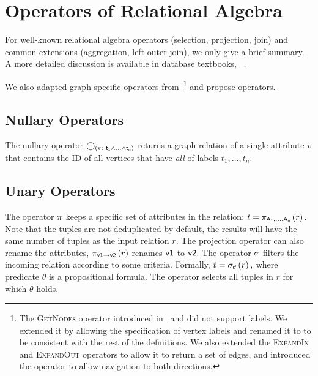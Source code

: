 \section{Operators of Relational Algebra}

For well-known relational algebra operators (\eg selection, projection, join) and common extensions (\eg aggregation, left outer join), we only give a brief summary. A more detailed discussion is available in database textbooks, \eg~\cite{DBLP:books/daglib/0020812, DBLP:books/daglib/0006733}.

We also adapted graph-specific operators from~\cite{DBLP:conf/edbt/HolschG16}\footnote{The \textsc{GetNodes} operator introduced in~\cite{DBLP:conf/edbt/HolschG16} and did not support labels. We extended it by allowing the specification of vertex labels and renamed it to \getverticestext to be consistent with the rest of the definitions. We also extended the \textsc{ExpandIn} and \textsc{ExpandOut} operators to allow it to return a set of edges, and introduced the \expandbothtext operator to allow navigation to both directions.} and propose operators.

\subsection{Nullary Operators}
\label{sec:nullary-operators}

The \getverticestext nullary operator $\getvertices{v}{t_1 \land \ldots \land t_n}$ returns a graph relation of a single attribute $v$ that contains the ID of all vertices that have \emph{all} of labels $t_1, \ldots, t_n$.

\subsection{Unary Operators}
\label{sec:unary-operators}

The \projectiontext operator $\pi$ keeps a specific set of attributes in the relation: $ t = \pi_{\mathsf{A_1, \ldots, A_n}} \left(r\right).$ Note that the tuples are not deduplicated by default, \ie the results will have the same number of tuples as the input relation $r$. The projection operator can also rename the attributes, \eg $\pi_{\mathsf{v1 \rightarrow v2}} \left(r\right)$ renames $\mathsf{v1}$ to $\mathsf{v2}$.
The \selectiontext operator $\sigma$ filters the incoming relation according to some criteria. Formally,
$ t = \sigma_{\mathsf{\theta}} \left(r\right), $
where predicate $\theta$ is a propositional formula. The operator selects all tuples in $r$ for which $\theta$ holds.

